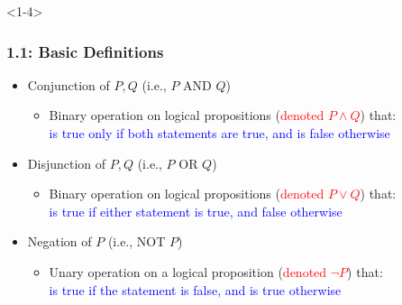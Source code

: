 \documentclass[10pt,english,aspectratio=169]{beamer}
\begin{document}
\begin{frame}<1-4> \frametitle{1.1: Basic Definitions}

\begin{itemize}

\item<1-> Conjunction of $P,Q$ (i.e., $P$ AND $Q$)

\begin{itemize}
  \setlength\itemsep{1mm}
  \item Binary operation on logical propositions (\textcolor{red}{denoted $P \wedge Q$}) that:\\ \hspace{2mm} \textcolor{blue}{is true only if both statements are true, and is false otherwise}
\end{itemize}

\vspace{0.5mm}

\item<2-> Disjunction of $P,Q$ (i.e., $P$ OR $Q$)

\begin{itemize}
  \setlength\itemsep{1mm}
  \item Binary operation on logical propositions (\textcolor{red}{denoted $P \vee Q$}) that: \\ \hspace{2mm} \textcolor{blue}{is true if either statement is true, and false otherwise}
\end{itemize}

\vspace{0.5mm}

\item<3-> Negation of $P$ (i.e., NOT $P$)

\begin{itemize}
  \setlength\itemsep{1mm}
  \item Unary operation on a logical proposition (\textcolor{red}{denoted $\neg P$}) that: \\ \hspace{2mm} \textcolor{blue}{is true if the statement is false, and is true otherwise}
\end{itemize}


\end{itemize}
\end{frame}
\end{document}
